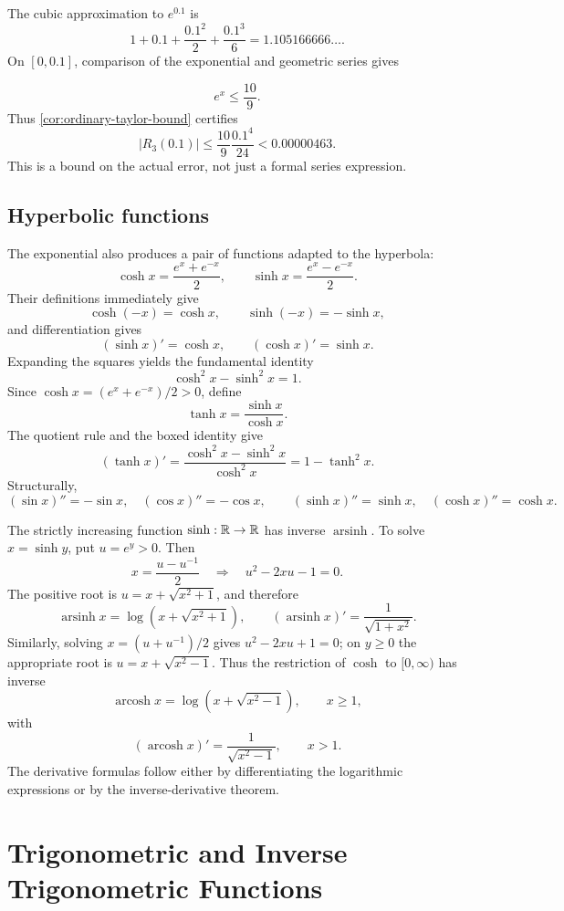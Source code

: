 \begin{example}
The cubic approximation to $e^{0.1}$ is
\[
1+0.1+\frac{0.1^2}{2}+\frac{0.1^3}{6}=1.105166666\ldots.
\]
On $[0,0.1]$, comparison of the exponential and geometric series gives

\[
e^x\leq\frac{10}{9}.
\]
 Thus \cref{cor:ordinary-taylor-bound} certifies
\[
|R_3(0.1)|\leq\frac{10}{9}\frac{0.1^4}{24}<0.00000463.
\]
This is a bound on the actual error, not just a formal series expression.
\end{example}

\subsection*{Hyperbolic functions}
The exponential also produces a pair of functions adapted to the hyperbola:
\[
\cosh x=\frac{e^x+e^{-x}}2,
\qquad
\sinh x=\frac{e^x-e^{-x}}2.
\]
Their definitions immediately give
\[
\cosh(-x)=\cosh x,\qquad \sinh(-x)=-\sinh x,
\]
and differentiation gives
\[
(\sinh x)'=\cosh x,\qquad(\cosh x)'=\sinh x.
\]
Expanding the squares yields the fundamental identity
\[
\boxed{\cosh^2x-\sinh^2x=1.}
\]
Since \(\cosh x=(e^x+e^{-x})/2>0\), define
\[
\tanh x=\frac{\sinh x}{\cosh x}.
\]
The quotient rule and the boxed identity give
\[
(\tanh x)'=\frac{\cosh^2x-\sinh^2x}{\cosh^2x}
=1-\tanh^2x.
\]
Structurally,
\[
(\sin x)''=-\sin x,\quad(\cos x)''=-\cos x,
\qquad
(\sinh x)''=\sinh x,\quad(\cosh x)''=\cosh x.
\]

The strictly increasing function \(\sinh:\mathbb{R}\to\mathbb{R}\) has inverse
\(\operatorname{arsinh}\). To solve $x=\sinh y$, put $u=e^y>0$. Then
\[
x=\frac{u-u^{-1}}2
\quad\Longrightarrow\quad
u^2-2xu-1=0.
\]
The positive root is $u=x+\sqrt{x^2+1}$, and therefore
\[
\operatorname{arsinh}x
=\log\!\left(x+\sqrt{x^2+1}\right),
\qquad
(\operatorname{arsinh}x)'=\frac1{\sqrt{1+x^2}}.
\]
Similarly, solving $x=(u+u^{-1})/2$ gives
$u^2-2xu+1=0$; on $y\geq0$ the appropriate root is
$u=x+\sqrt{x^2-1}$. Thus the restriction of \(\cosh\) to
\([0,\infty)\) has inverse
\[
\operatorname{arcosh}x
=\log\!\left(x+\sqrt{x^2-1}\right),\qquad x\geq1,
\]
with
\[
(\operatorname{arcosh}x)'=\frac1{\sqrt{x^2-1}},\qquad x>1.
\]
The derivative formulas follow either by differentiating the logarithmic
expressions or by the inverse-derivative theorem.

\section{Trigonometric and Inverse Trigonometric Functions}
\label{sec:trigonometric-functions}

